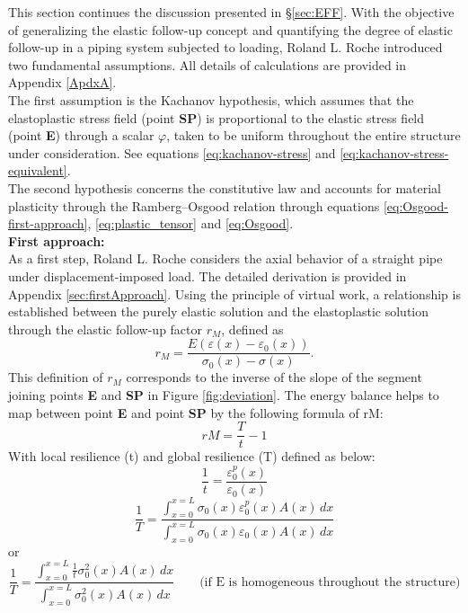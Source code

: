 \documentclass[10pt,a4paper]{article}
\begin{document}
This section continues the discussion presented in §\ref{sec:EFF}. With the objective of generalizing the elastic follow-up concept and quantifying the degree of elastic follow-up in a piping system subjected to loading, Roland L. Roche introduced two fundamental assumptions. All details of calculations are provided in Appendix \ref{ApdxA}. \\
The first assumption is the Kachanov hypothesis, which assumes that the elastoplastic stress field (point \textbf{SP}) is proportional to the elastic stress field (point \textbf{E}) through a scalar  $\varphi$, taken to be uniform throughout the entire structure under consideration. See equations \eqref{eq:kachanov-stress} and \eqref{eq:kachanov-stress-equivalent}.\\
The second hypothesis concerns the constitutive law and accounts for material plasticity through the Ramberg--Osgood relation through equations \eqref{eq:Osgood-first-approach}, \eqref{eq:plastic_tensor} and \eqref{eq:Osgood}. \\

\vspace{1cm}
\textbf{First approach:} \\
As a first step, Roland L. Roche considers the axial behavior of a straight pipe under displacement-imposed load. The detailed derivation is provided in Appendix \ref{sec:firstApproach}. Using the principle of virtual work, a relationship is established between the purely elastic solution and the elastoplastic solution through the elastic follow-up factor $r_M$, defined as
\[
r_M=\frac{E\left(\varepsilon(x)-\varepsilon_0(x)\right)}
{\sigma_0(x)-\sigma(x)}.
\]
This definition of $r_M$ corresponds to the inverse of the slope of the segment joining points \textbf{E} and \textbf{SP} in Figure \ref{fig:deviation}.
The energy balance helps to map between point \textbf{E} and point \textbf{SP} by the following formula of rM:
\begin{equation*}
	rM    =\frac{T}{t} -1
\end{equation*}
With local resilience (t) and global resilience (T) defined as below:
\begin{equation*} 
\frac{1}{t}= \frac{ \varepsilon_0^p(x)}{ \varepsilon_0(x)}
\end{equation*} 
\begin{equation*} 
\frac{1}{T}= \frac{ \int_{x=0}^{x=L} \sigma_0(x) \varepsilon_0^p(x) A(x) \, dx }{  \int_{x=0}^{x=L} \sigma_0(x) \varepsilon_0(x) A(x) \, dx }
\end{equation*} 
or 
\begin{equation*} 
\frac{1}{T}=\frac{ \int_{x=0}^{x=L} \frac{1}{t} \sigma_0^2(x) A(x) \, dx}{\int_{x=0}^{x=L} \sigma_0^2(x) A(x) \, dx}     \ \ \ \ \ \ \ \ \ \text{(if E is homogeneous throughout the structure)}
\end{equation*} 
\end{document}
